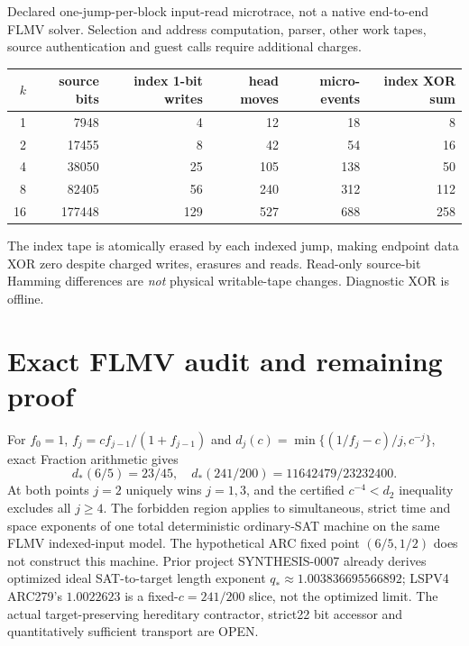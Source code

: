 \documentclass[11pt]{article}
\begin{document}
Declared one-jump-per-block input-read microtrace, not a native
end-to-end FLMV solver. Selection and address computation, parser,
other work tapes, source authentication and guest calls require
additional charges.
\begin{center}\begin{tabular}{rrrrrr}\toprule
$k$ & source bits & index 1-bit writes & head moves &
micro-events & index XOR sum\\\midrule
1 & 7948 & 4 & 12 & 18 & 8\\
2 & 17455 & 8 & 42 & 54 & 16\\
4 & 38050 & 25 & 105 & 138 & 50\\
8 & 82405 & 56 & 240 & 312 & 112\\
16 & 177448 & 129 & 527 & 688 & 258\\\bottomrule
\end{tabular}\end{center}
The index tape is atomically erased by each indexed jump,
making endpoint data XOR zero despite charged writes, erasures
and reads. Read-only source-bit Hamming differences are \emph{not}
physical writable-tape changes. Diagnostic XOR is offline.

\section{Exact FLMV audit and remaining proof}
For $f_0=1$, $f_j=cf_{j-1}/(1+f_{j-1})$ and
$d_j(c)=\min\{(1/f_j-c)/j,c^{-j}\}$, exact Fraction arithmetic gives
\[
d_*(6/5)=23/45,\quad
d_*(241/200)=11642479/23232400.
\]
At both points $j=2$ uniquely wins $j=1,3$, and the certified
$c^{-4}<d_2$ inequality excludes all $j\ge4$.
The forbidden region applies to simultaneous, strict time and
space exponents of one total deterministic ordinary-SAT machine
on the same FLMV indexed-input model. The hypothetical ARC fixed
point $(6/5,1/2)$ does not construct this machine. Prior project
SYNTHESIS-0007 already derives optimized ideal SAT-to-target
length exponent $q_*\approx1.003836695566892$; LSPV4 ARC279's
$1.0022623$ is a fixed-$c=241/200$ slice, not the optimized limit.
The actual target-preserving hereditary contractor, strict22
bit accessor and quantitatively sufficient transport are OPEN.
\end{document}
